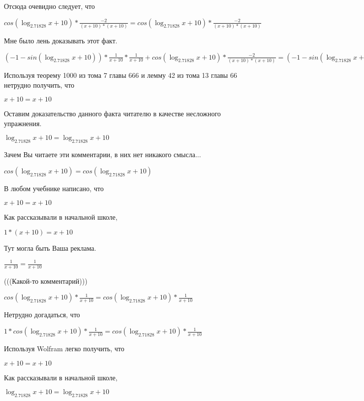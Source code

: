 \documentclass[12pt,a4paper,fleqn]{article}
\theoremstyle{definition}
\begin{document}
Отсюда очевидно следует, что 

$cos(\log_{ 2.71828 }{ x  +  10 }) * \frac{ -2 }{( x  +  10 ) * ( x  +  10 )}
 = cos(\log_{ 2.71828 }{ x  +  10 }) * \frac{ -2 }{( x  +  10 ) * ( x  +  10 )}
$

Мне было лень доказывать этот факт.

$( -1  - sin(\log_{ 2.71828 }{ x  +  10 })) * \frac{ 1 }{ x  +  10 }
 * \frac{ 1 }{ x  +  10 }
 + cos(\log_{ 2.71828 }{ x  +  10 }) * \frac{ -2 }{( x  +  10 ) * ( x  +  10 )}
 = ( -1  - sin(\log_{ 2.71828 }{ x  +  10 })) * \frac{ 1 }{ x  +  10 }
 * \frac{ 1 }{ x  +  10 }
 + cos(\log_{ 2.71828 }{ x  +  10 }) * \frac{ -2 }{( x  +  10 ) * ( x  +  10 )}
$

Используя теорему 1000 из тома 7 главы 666 и лемму 42 из тома 13 главы 66 нетрудно получить, что 

$ x  +  10  =  x  +  10 $

Оставим доказательство данного факта читателю в качестве несложного упражнения. 

$\log_{ 2.71828 }{ x  +  10 } = \log_{ 2.71828 }{ x  +  10 }$

Зачем Вы читаете эти комментарии, в них нет никакого смысла... 

$cos(\log_{ 2.71828 }{ x  +  10 }) = cos(\log_{ 2.71828 }{ x  +  10 })$

В любом учебнике написано, что 

$ x  +  10  =  x  +  10 $

Как рассказывали в начальной школе, 

$ 1  * ( x  +  10 ) =  x  +  10 $

Тут могла быть Ваша реклама. 

$\frac{ 1 }{ x  +  10 }
 = \frac{ 1 }{ x  +  10 }
$

(((Какой-то комментарий))) 

$cos(\log_{ 2.71828 }{ x  +  10 }) * \frac{ 1 }{ x  +  10 }
 = cos(\log_{ 2.71828 }{ x  +  10 }) * \frac{ 1 }{ x  +  10 }
$

Нетрудно догадаться, что 

$ 1  * cos(\log_{ 2.71828 }{ x  +  10 }) * \frac{ 1 }{ x  +  10 }
 = cos(\log_{ 2.71828 }{ x  +  10 }) * \frac{ 1 }{ x  +  10 }
$

Используя Wolfram легко получить, что 

$ x  +  10  =  x  +  10 $

Как рассказывали в начальной школе, 

$\log_{ 2.71828 }{ x  +  10 } = \log_{ 2.71828 }{ x  +  10 }$
\end{document}
